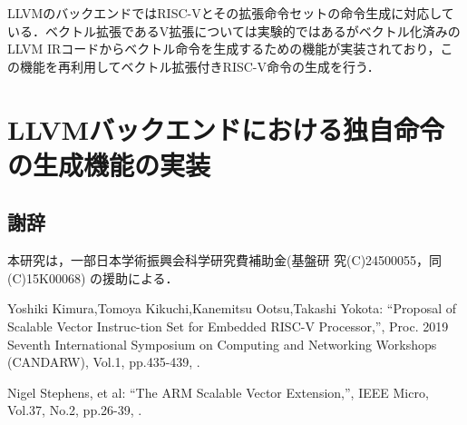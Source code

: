\documentclass[a4paper,9pt, twocolumn]{jarticle}
\renewcommand{\baselinestretch}{0.87}   %
\begin{document}
LLVMのバックエンドではRISC-Vとその拡張命令セットの命令生成に対応している．ベクトル拡張であるV拡張については実験的ではあるがベクトル化済みのLLVM IRコードからベクトル命令を生成するための機能が実装されており，この機能を再利用してベクトル拡張付きRISC-V命令の生成を行う．

\section{LLVMバックエンドにおける独自命令の生成機能の実装}

\renewcommand{\baselinestretch}{0.83}\selectfont
\subsection*{\small 謝辞}
\vspace{-0.5mm}
{\small 本研究は，一部日本学術振興会科学研究費補助金(基盤研
究(C)24500055，同(C)15K00068) の援助による．}


%
%
\begin{thebibliography}{9}
\itemsep -1.7pt

{\small Yoshiki Kimura,Tomoya Kikuchi,Kanemitsu Ootsu,Takashi Yokota:      %
\newblock ``Proposal of Scalable Vector Instruc-tion Set for Embedded RISC-V Processor,'',
\newblock Proc. 2019 Seventh International Symposium on Computing and Networking Workshops (CANDARW),
\newblock Vol.1,
\newblock pp.435-439,
.}

{\small Nigel Stephens, et al:      %
\newblock ``The ARM Scalable Vector Extension,'',
\newblock IEEE Micro,
\newblock Vol.37,
\newblock No.2,
\newblock pp.26-39,
.}

\end{thebibliography}
\end{document}
